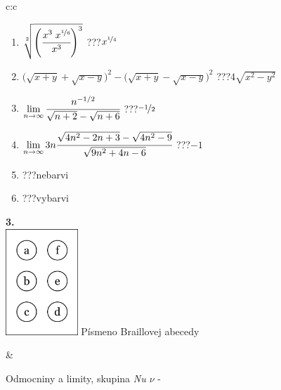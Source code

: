 \documentclass[10pt]{report}
\begin{document}
\begin{tabular}{c:c}
\begin{minipage}[c][104.5mm][t]{0.5\linewidth}
\begin{center}
\begin{minipage}{0.79\linewidth}
\begin{center}
\begin{varwidth}{\linewidth}
\begin{enumerate}
\small
\item $\sqrt[2]{\left(\cfrac{x^{3}\;x^{\nicefrac{1}{6}}}{x^{3}}\right)^{3}}$\quad \dotfill\; ???\;\dotfill \quad $x^{\nicefrac{1}{4}}$
\item {\footnotesize{\scriptsize$\big(\sqrt{x+y}+\sqrt{x-y}\big)^2-\big(\sqrt{x+y}-\sqrt{x-y}\big)^2$}\quad \dotfill\; ???\;\dotfill \quad $4\sqrt{x^2-y^2}$}
\item $\lim\limits_{n\to\infty}\cfrac{n^{-1/2}}{\sqrt{n+2}-\sqrt{n+6}}$\quad \dotfill\; ???\;\dotfill \quad $\nicefrac{-1}{2}$
\item $\lim\limits_{n\to\infty}3n\cfrac{\sqrt{4n^2-2n+3}-\sqrt{4n^2-9}}{\sqrt{9n^2+4n-6}}$\quad \dotfill\; ???\;\dotfill \quad $-1$
\item \quad \dotfill\; ???\;\dotfill \quad nebarvi
\item \quad \dotfill\; ???\;\dotfill \quad vybarvi
\end{enumerate}
\end{varwidth}
\end{center}
\end{minipage}
\begin{minipage}{0.20\linewidth}
\begin{center}
{\Huge\bfseries 3.} \\[2mm]
\includegraphics[height=40mm]{../images/braille.png}
{\small Písmeno Braillovej abecedy}
\end{center}
\end{minipage}
\end{center}
\end{minipage}
&
\begin{minipage}[c][104.5mm][t]{0.5\linewidth}
\begin{center}
\vspace{7mm}
{\huge Odmocniny a limity, skupina \textit{Nu $\nu$} -}\\[5mm]

\end{center}
\end{minipage}
\end{tabular}
\end{document}
